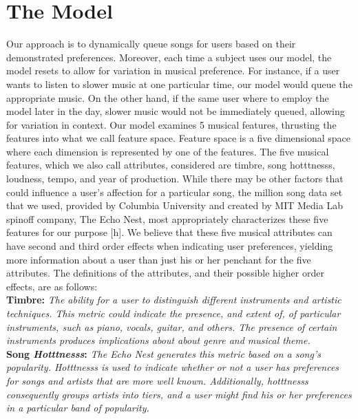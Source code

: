 \documentclass{amsart}
\theoremstyle{plain}
\theoremstyle{definition}
\begin{document}
   	\section{The Model}
   	Our approach is to dynamically queue songs for users based on their demonstrated preferences. Moreover, each time a subject uses our model, the model resets to allow for variation in musical preference. For instance, if a user wants to listen to slower music at one particular time, our model would queue the appropriate music. On the other hand, if the same user where to employ the model later in the day, slower music would not be immediately queued, allowing for variation in context. Our model examines 5 musical features, thrusting the features into what we call feature space. Feature space is a five dimensional space where each dimension is represented by one of the features. The five musical features, which we also call attributes, considered are timbre, song hotttnesss, loudness, tempo, and year of production. While there may be other factors that could influence a user's affection for a particular song, the million song data set that we used, provided by Columbia University and created by MIT Media Lab spinoff company, The Echo Nest, most appropriately characterizes these five features for our purpose [h]. We believe that these five musical attributes can have second and third order effects when indicating user preferences, yielding more information about a user than just his or her penchant for the five attributes. The definitions of the attributes, and their possible higher order effects, are as follows: \\
   	
  	\noindent \textbf{Timbre: }\textit{The ability for a user to distinguish different instruments and artistic techniques. This metric could indicate the presence, and extent of, of particular instruments, such as piano, vocals, guitar, and others. The presence of certain instruments produces implications about about genre and musical theme.} \\
  	
  	\noindent \textbf{Song \textit{Hotttnesss}: }\textit{The Echo Nest generates this metric based on a song's popularity. Hotttnesss is used to indicate whether or not a user has preferences for songs and artists that are more well known. Additionally, hotttnesss consequently groups artists into tiers, and a user might find his or her preferences in a particular band of popularity.} \\
  	
\end{document}
